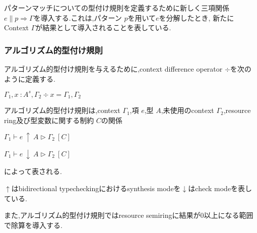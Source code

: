 \documentclass{jsarticle}
\begin{document}
パターンマッチについての型付け規則を定義するために新しく三項関係 $e \parallel p \Rightarrow \Gamma$を導入する.これは,パターン $p$を用いて$e$を分解したとき,
新たにContext $\Gamma$が結果として導入されることを表している.

\begin{center}
\end{center}

\subsubsection{アルゴリズム的型付け規則\\}

アルゴリズム的型付け規則を与えるために,context difference operator $\div$を次のように定義する.

\begin{center}
  $\Gamma_1,x\ \colon A^s,\Gamma_2 \div x = \Gamma_1,\Gamma_2$
\end{center}

アルゴリズム的型付け規則は,context $\Gamma_1$,項 $e$,型 $A$,未使用のcontext $\Gamma_2$,resource ring及び型変数に関する制約 $C$の関係
\begin{multicols}{2}
  \begin{center}
    $\Gamma_1 \vdash e\ \uparrow\ A \vartriangleright \Gamma_2\ [C]$\\
  \end{center}
  \begin{center}
    $\Gamma_1 \vdash e\ \downarrow\ A \vartriangleright \Gamma_2\ [C]$\\
  \end{center}
\end{multicols}
によって表される.

$\uparrow$はbidirectional typecheckingにおけるsynthesis modeを$\downarrow$はcheck modeを表している.

また,アルゴリズム的型付け規則ではresource semiringに結果が0以上になる範囲で除算を導入する.


\end{document}
